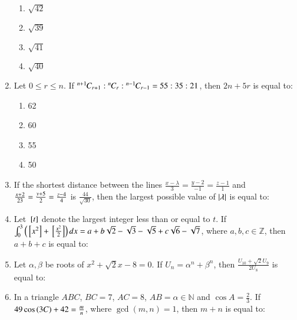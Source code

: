 \documentclass[journal]{IEEEtran}
\begin{document}
\begin{enumerate}[start=16]
\begin{enumerate}
\item $\sqrt{42}$
\item $\sqrt{39}$
\item $\sqrt{41}$
\item $\sqrt{40}$
\end{enumerate}

\item Let $0\leq r\leq n$. If ${{}^{n+1}\mkern-1muC_{r+1}}:{{}^{n}\mkern-1muC_{r}}:{{}^{n-1}\mkern-1muC_{r-1}}=55:35:21$, then $2n+5r$ is equal to:
\begin{enumerate}
\item 62
\item 60
\item 55
\item 50
\end{enumerate}
\item If the shortest distance between the lines $\frac{x-\lambda}{3}=\frac{y-2}{-1}=\frac{z-1}{1}$ and $\frac{x+2}{2\-3}=\frac{y+5}{2}=\frac{z-4}{4}$ is $\frac{44}{\sqrt{30}}$, then the largest possible value of $\left\vert\lambda\right\vert$ is equal to:
\item Let ${}\left[t\right]$ denote the largest integer less than or equal to $t$. If $\int_{0}^{3}\left({}\left[x^{2}\right]+{}\left[\frac{x^{2}}{2}\right]\right)dx=a+b\sqrt{2}-\sqrt{3}-\sqrt{5}+c\sqrt{6}-\sqrt{7}$, where $a, b, c\in\mathbb{Z}$, then $a+b+c$ is equal to:

\item Let $\alpha, \beta$ be roots of $x^{2}+\sqrt{2}x-8=0$. If $U_{n}=\alpha^{n}+\beta^{n}$, then $\frac{U_{10}+\sqrt{2}U_{9}}{2U_{8}}$ is equal to:

\item In a triangle $ABC$, $BC=7$, $AC=8$, $AB=\alpha\in\mathbb{N}$ and $\cos A=\frac{2}{3}$. If $49\cos\left(3C\right)+42=\frac{m}{n}$, where $\gcd(m,n)=1$, then $m+n$ is equal to:


\end{enumerate}
\end{document}
